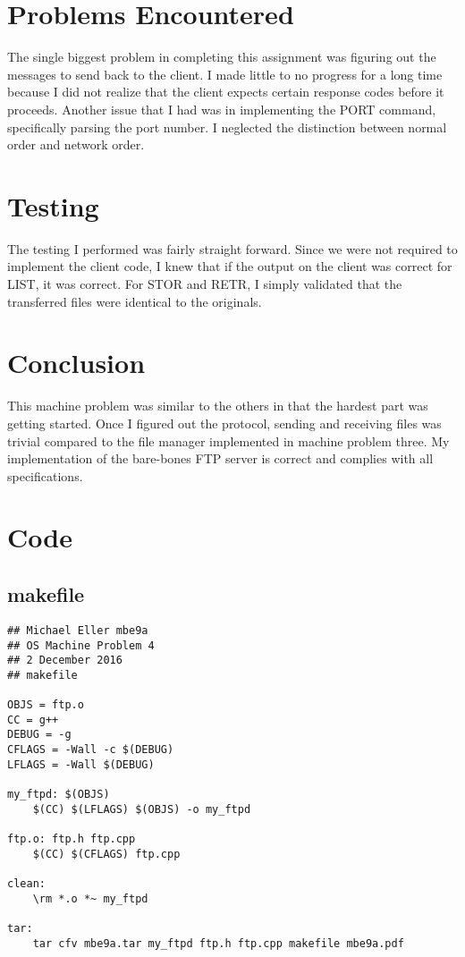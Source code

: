 \documentclass[12pt,letter,titlepage]{article}
\begin{document}
\section*{Problems Encountered}
The single biggest problem in completing this assignment was figuring out the messages to send back to the client. I made little to no progress for a long time because I did not realize that the client expects certain response codes before it proceeds. Another issue that I had was in implementing the {\color{orange}PORT} command, specifically parsing the port number. I neglected the distinction between normal order and network order.

\section*{Testing}
The testing I performed was fairly straight forward. Since we were not required to implement the client code, I knew that if the output on the client was correct for {\color{orange}LIST}, it was correct. For {\color{orange}STOR} and {\color{orange}RETR}, I simply validated that the transferred files were identical to the originals.

\section*{Conclusion}
This machine problem was similar to the others in that the hardest part was getting started. Once I figured out the protocol, sending and receiving files was trivial compared to the file manager implemented in machine problem three. My implementation of the bare-bones FTP server is correct and complies with all specifications.

\pagebreak
\section*{Code}
\linespread{1}
\subsection*{makefile}{
\scriptsize{
\begin{verbatim}
## Michael Eller mbe9a
## OS Machine Problem 4
## 2 December 2016
## makefile

OBJS = ftp.o
CC = g++
DEBUG = -g
CFLAGS = -Wall -c $(DEBUG)
LFLAGS = -Wall $(DEBUG)

my_ftpd: $(OBJS)
	$(CC) $(LFLAGS) $(OBJS) -o my_ftpd

ftp.o: ftp.h ftp.cpp
	$(CC) $(CFLAGS) ftp.cpp

clean:
	\rm *.o *~ my_ftpd

tar:
	tar cfv mbe9a.tar my_ftpd ftp.h ftp.cpp makefile mbe9a.pdf
\end{verbatim}
}}
\end{document}
